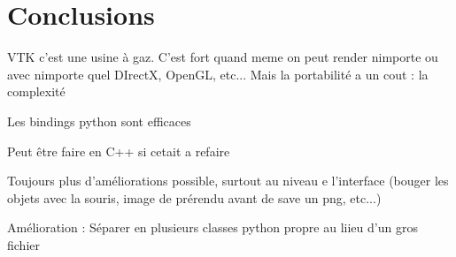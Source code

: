 \documentclass[10pt,twocolumn,letterpaper]{article}
\begin{document}
\section*{Conclusions}

VTK c'est une usine à gaz. C'est fort quand meme on peut render nimporte ou avec
nimporte quel DIrectX, OpenGL, etc... Mais la portabilité a un cout : la complexité

Les bindings python sont efficaces

Peut être faire en C++ si cetait a refaire

Toujours plus d'améliorations possible, surtout au niveau e l'interface
(bouger les objets avec la souris, image de prérendu avant de save un png, etc...)

Amélioration : Séparer en plusieurs classes python propre au liieu d'un gros fichier


\end{document}
